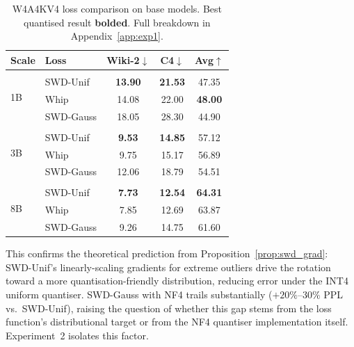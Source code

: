 \documentclass[11pt,a4paper]{article}
\newcommand{\best}[1]{\textbf{#1}}
\begin{document}
\begin{table}[t]
\centering
\caption{W4A4KV4 loss comparison on base models. Best quantised result \textbf{bolded}. Full breakdown in Appendix~\ref{app:exp1}.}
\label{tab:exp1_main}
\vspace{0.3em}
\small
\begin{tabular}{ll cc c}
\toprule
\textbf{Scale} & \textbf{Loss} & \textbf{Wiki-2}$\downarrow$ & \textbf{C4}$\downarrow$ & \textbf{Avg}$\uparrow$ \\
\midrule
\multirow{4}{*}{1B}
  & \color{gray}{\footnotesize FP16} & \color{gray}{\footnotesize 9.75} & \color{gray}{\footnotesize 14.29} & \color{gray}{\footnotesize 53.82} \\
  & SWD-Unif  & \best{13.90} & \best{21.53} & 47.35 \\
  & Whip      & 14.08 & 22.00 & \best{48.00} \\
  & SWD-Gauss & 18.05 & 28.30 & 44.90 \\
\midrule
\multirow{4}{*}{3B}
  & \color{gray}{\footnotesize FP16} & \color{gray}{\footnotesize 7.81} & \color{gray}{\footnotesize 11.70} & \color{gray}{\footnotesize 63.24} \\
  & SWD-Unif  & \best{9.53} & \best{14.85} & 57.12 \\
  & Whip      & 9.75 & 15.17 & 56.89 \\
  & SWD-Gauss & 12.06 & 18.79 & 54.51 \\
\midrule
\multirow{4}{*}{8B}
  & \color{gray}{\footnotesize FP16} & \color{gray}{\footnotesize 6.24} & \color{gray}{\footnotesize 9.54} & \color{gray}{\footnotesize 68.85} \\
  & SWD-Unif  & \best{7.73} & \best{12.54} & \best{64.31} \\
  & Whip      & 7.85 & 12.69 & 63.87 \\
  & SWD-Gauss & 9.26 & 14.75 & 61.60 \\
\bottomrule
\end{tabular}
\end{table}
 
This confirms the theoretical prediction from Proposition~\ref{prop:swd_grad}: SWD-Unif's linearly-scaling gradients for extreme outliers drive the rotation toward a more quantisation-friendly distribution, reducing error under the INT4 uniform quantiser. SWD-Gauss with NF4 trails substantially ($+20\%$--$30\%$ PPL vs.\ SWD-Unif), raising the question of whether this gap stems from the loss function's distributional target or from the NF4 quantiser implementation itself. Experiment~2 isolates this factor.
 
\end{document}
